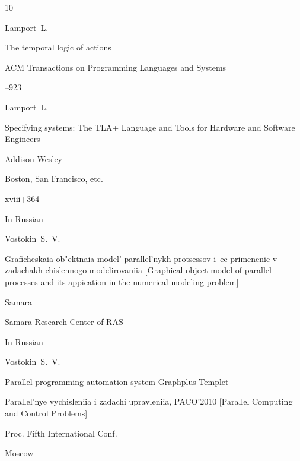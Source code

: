 \begin{thebibliography}{10}

\by Lamport~L.

\paper The temporal logic of actions

\jour ACM Transactions on Programming Languages and Systems



–923








\by Lamport~L.

\book Specifying systems: The TLA+ Language and Tools for Hardware and Software Engineers 

\publ Addison-Wesley

\publaddr Boston, San Francisco, etc.


\totalpages xviii+364






\lang In Russian

\by Vostokin~S.~V.

\book Graficheskaia ob"ektnaia model' parallel'nykh protsessov i~ee primenenie v zadachakh chislennogo modelirovaniia \rm [Graphical object model of parallel processes and its appication in the numerical modeling problem]

\publaddr Samara

\publ Samara Research Center of RAS








\lang In Russian

\by Vostokin~S.~V. 

\paper Parallel programming automation system Graphplus Templet 

\inbook Parallel'nye vychisleniia i zadachi upravleniia, \rm PACO’2010 \rm [Parallel Computing and Control Problems]

\bookinfo Proc. Fifth International Conf.

\publaddr Moscow


\end{thebibliography}
